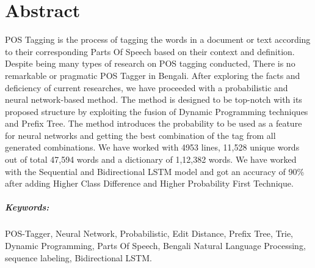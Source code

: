 \documentclass{standalone}
\begin{document}
\chapter*{Abstract}
POS Tagging is the process of tagging the words in a document or text according to their corresponding Parts Of Speech based on their context and definition. Despite being many types of research on POS tagging conducted, There is no remarkable or pragmatic POS Tagger in Bengali. After exploring the facts and deficiency of current researches, we have proceeded with a probabilistic and neural network-based method. The method is designed to be top-notch with its proposed structure by exploiting the fusion of Dynamic Programming techniques and Prefix Tree. The method introduces the probability to be used as a feature for neural networks and getting the best combination of the tag from all generated combinations. We have worked with 4953 lines, 11,528 unique words out of total 47,594 words and a dictionary of 1,12,382 words. We have worked with the Sequential and Bidirectional LSTM model and got an accuracy of 90\% after adding Higher Class Difference and Higher Probability First Technique. 

\clearpage
\paragraph*{Keywords:}POS-Tagger, Neural Network, Probabilistic, Edit Distance, Prefix Tree, Trie, Dynamic Programming, Parts Of Speech, Bengali Natural Language Processing, sequence labeling, Bidirectional LSTM.
\end{document}
